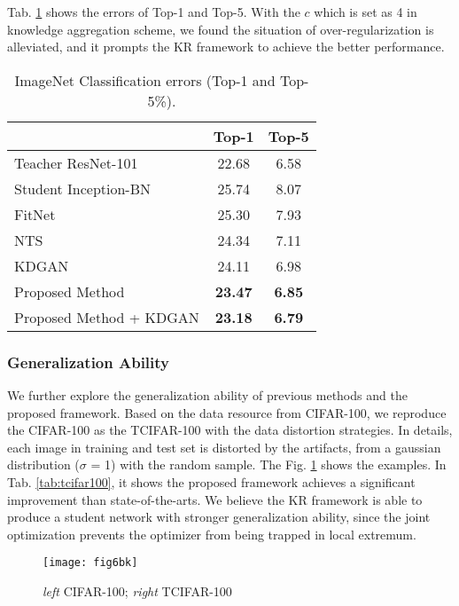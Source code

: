 \documentclass[10pt,twocolumn,letterpaper]{article}
\begin{document}
Tab. \ref{tab:imagenet1} shows the errors of Top-1 and Top-5.
With the $c$ which is set as 4 in knowledge aggregation scheme,
we found the situation of over-regularization is alleviated,
and it prompts the KR framework to achieve the better performance.

\begin{table}[h]
\begin{center}
\begin{tabular}{l|c|c}
\hline
 & Top-1 & Top-5 \\
\hline
Teacher ResNet-101 & 22.68 & 6.58 \\
Student Inception-BN \cite{Bn2015} & 25.74 & 8.07 \\
FitNet \cite{Romero2014FitNets} & 25.30 & 7.93 \\
NTS \cite{huang2017like} & 24.34 & 7.11 \\
KDGAN \cite{wang2018kdgan} & 24.11 & 6.98 \\
Proposed Method & \textbf{23.47} & \textbf{6.85} \\
Proposed Method + KDGAN \cite{wang2018kdgan} & \textbf{23.18} & \textbf{6.79} \\
\hline
\end{tabular}
\end{center}
\caption{ImageNet Classification errors (Top-1 and Top-5\%). }
\label{tab:imagenet1}
\end{table}

\subsubsection{Generalization Ability}
We further explore the generalization ability of
previous methods and the proposed framework.
Based on the data resource from CIFAR-100,
we reproduce the CIFAR-100 as the TCIFAR-100
with the data distortion strategies.
In details,
each image in training and test set is distorted by the artifacts,
from a gaussian distribution ($\sigma$ = 1) with the random sample.
The Fig. \ref{fig:tcifar-100ep} shows the examples.
In Tab. \ref{tab:tcifar100},
it shows the proposed framework
achieves a significant improvement than state-of-the-arts.
We believe the KR framework is able to produce
a student network with stronger generalization ability,
since the joint optimization prevents the optimizer
from being trapped in local extremum.

\begin{figure}[ht]
  \centering
  \texttt{[image: fig6bk]}
  \caption{\emph{left} CIFAR-100; \emph{right} TCIFAR-100}
  \label{fig:tcifar-100ep}
\end{figure}
\end{document}
